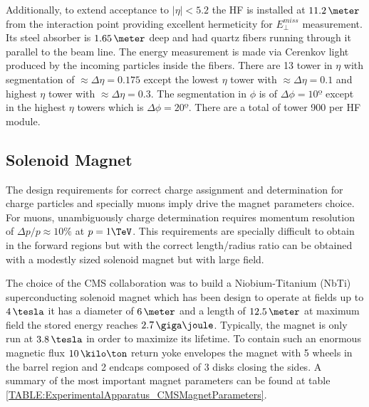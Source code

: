Additionally, to extend acceptance to $|\eta|<5.2$ the \gls{HF} is installed at $11.2\,\meter$ from the interaction point providing excellent hermeticity for $E_{\perp}^{miss}$ measurement. Its steel absorber is $1.65\,\meter$ deep and had quartz fibers running through it parallel to the beam line. The energy measurement is made via Cerenkov light produced by the incoming particles inside the fibers. There are 13 tower in $\eta$ with segmentation of $\approx \Delta\eta=0.175$ except the lowest $\eta$ tower with $\approx \Delta\eta=0.1$ and highest $\eta$ tower with $\approx \Delta\eta=0.3$. The segmentation in $\phi$ is of $\Delta\phi=10º$ except in the highest $\eta$ towers which is $\Delta\phi=20º$. There are a total of tower 900 per \gls{HF} module. 



\subsection{Solenoid Magnet}
\label{SUBSECTION:ExperimentalApparatus_CMS_Magnet}


The design requirements for correct charge assignment and \pt determination for charge particles and specially muons imply drive the magnet parameters choice. For muons, unambiguously charge determination requires momentum resolution of $\Delta p/p \approx 10\%$ at $p = 1 \TeV$. This requirements are specially difficult to obtain in the forward regions but with the correct length/radius ratio can be obtained with a modestly sized solenoid magnet but with large field\cite{CMSTDR:CMSUpgradeTDR}.

The choice of the \gls{CMS} collaboration was to build a Niobium-Titanium (NbTi) superconducting solenoid magnet which has been design to operate at fields up to $4\,\tesla$ it has a diameter of $6\,\meter$ and a length of $12.5\,\meter$ at maximum field the stored energy reaches $2.7\,\giga\joule$. Typically, the magnet is only run at $3.8\,\tesla$ in order to maximize its lifetime. To contain such an enormous magnetic flux $10\,\kilo\ton$ return yoke envelopes the magnet with 5 wheels in the barrel region and 2 endcaps composed of 3 disks closing the sides\cite{ARTICLE:TheCMSExperiment}. A summary of the most important magnet parameters can be found at table \ref{TABLE:ExperimentalApparatus_CMSMagnetParameters}.

